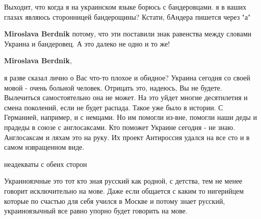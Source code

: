 \begin{itemize}
\begin{itemize}
Выходит, что когда я на украинском языке борюсь с бандеровцами. я в ваших
глазах являюсь сторонницей бандерощины? Кстати, бАндера пишется через "а"

 
\textbf{Miroslava Berdnik} потому, что эти поставили знак равенства между словами Украина и бандеровец. А это далеко не одно и то же!

 
\textbf{Miroslava Berdnik}, 

я разве сказал лично о Вас что-то плохое и обидное? Украина сегодня со своей
мовой - очень больной человек. Отрицать это, надеюсь, Вы не будете. Вылечиться
самостоятельно она не может. На это уйдет многие десятилетия и смена поколений,
если не будет распада. Такое уже было в истории. С Германией, например, и с
немцами. Но им помогли из-вне, помогли наши деды и прадеды в союзе с
англосаксами. Кто поможет Украине сегодня - не знаю. Англосаксам и ляхам это на
руку. Их проект Антироссия удался на все сто и в самом извращенном виде.

\end{itemize}

 
неадекваты с обеих сторон

 

Украиноязчные это тот кто зная русский как родной, с детства, тем не менее
говорит исключительно на мове. Даже если общается с каким то нигерийцем которые
по счастью для себя учился в Москве и потому знает русский, украиноязычный все
равно упорно будет говорить на мове. 


\end{itemize}
